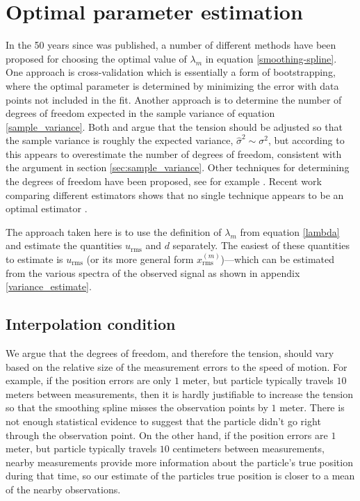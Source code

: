 \documentclass[10pt,journal]{IEEEtran}
\begin{document}
%
\section{Optimal parameter estimation} \label{sec:optimal_parameter}
%

In the 50 years since \cite{reinsch1967-nm} was published, a number of different methods have been proposed for choosing the optimal value of $\lambda_m$ in equation \ref{smoothing-spline}. One approach is cross-validation \cite{wahba1978-jrss-b,craven1979-nm} which is essentially a form of bootstrapping, where the optimal parameter is determined by minimizing the error with data points not included in the fit. Another approach is to determine the number of degrees of freedom expected in the sample variance of equation \ref{sample_variance}. Both \cite{reinsch1967-nm} and \cite{teanby2007-mg} argue that the tension should be adjusted so that the sample variance is roughly the expected variance, $\hat{\sigma}^2 \sim \sigma^2$, but according to \cite{wahba1990-siam} this appears to overestimate the number of degrees of freedom, consistent with the argument in section \ref{sec:sample_variance}. Other techniques for determining the degrees of freedom have been proposed, see for example \cite{cantoni2002-biom}. Recent work comparing different estimators shows that no single technique appears to be an optimal estimator \cite{lee2003-csda}.

The approach taken here is to use the definition of $\lambda_m$ from equation \ref{lambda} and estimate the quantities $u_{\textrm{rms}}$ and $d$ separately. The easiest of these quantities to estimate is $u_{\textrm{rms}}$ (or its more general form $x^{(m)}_{\textrm{rms}}$)---which can be estimated from the various spectra of the observed signal as shown in appendix \ref{variance_estimate}.

\subsection{Interpolation condition} \label{interpolation_condition}

We argue that the degrees of freedom, and therefore the tension, should vary based on the relative size of the measurement errors to the speed of motion. For example, if the position errors are only $1$ meter, but particle typically travels $10$ meters between measurements, then it is hardly justifiable to increase the tension so that the smoothing spline misses the observation points by $1$ meter. There is not enough statistical evidence to suggest that the particle didn't go right through the observation point. On the other hand, if the position errors are  $1$ meter, but particle typically travels $10$ centimeters between measurements, nearby measurements provide more information about the particle's true position during that time, so our estimate of the particles true position is closer to a mean of the nearby observations.
\end{document}
